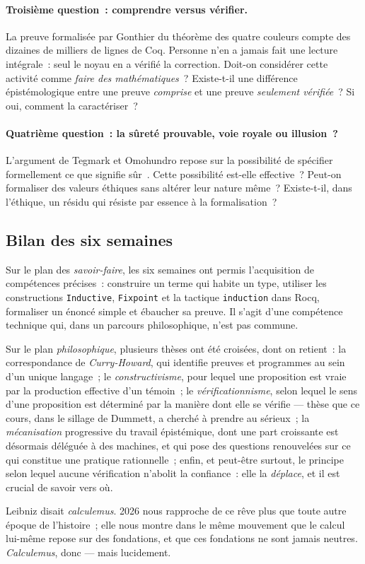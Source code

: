 \documentclass[11pt,a4paper]{article}
\begin{document}
\paragraph{Troisième question~: comprendre versus vérifier.} La preuve formalisée par Gonthier du théorème des quatre couleurs compte des dizaines de milliers de lignes de Coq. Personne n'en a jamais fait une lecture intégrale~: seul le noyau en a vérifié la correction. Doit-on considérer cette activité comme \emph{faire des mathématiques}~? Existe-t-il une différence épistémologique entre une preuve \emph{comprise} et une preuve \emph{seulement vérifiée}~? Si oui, comment la caractériser~?

\paragraph{Quatrième question~: la sûreté prouvable, voie royale ou illusion~?} L'argument de Tegmark et Omohundro repose sur la possibilité de spécifier formellement ce que signifie \og sûr~\fg. Cette possibilité est-elle effective~? Peut-on formaliser des valeurs éthiques sans altérer leur nature même~? Existe-t-il, dans l'éthique, un résidu qui résiste par essence à la formalisation~?

\bigskip

\subsection{Bilan des six semaines}

Sur le plan des \emph{savoir-faire}, les six semaines ont permis l'acquisition de compétences précises~: construire un terme qui habite un type, utiliser les constructions \texttt{Inductive}, \texttt{Fixpoint} et la tactique \texttt{induction} dans Rocq, formaliser un énoncé simple et ébaucher sa preuve. Il s'agit d'une compétence technique qui, dans un parcours philosophique, n'est pas commune.

Sur le plan \emph{philosophique}, plusieurs thèses ont été croisées, dont on retient~: la correspondance de \emph{Curry-Howard}, qui identifie preuves et programmes au sein d'un unique langage~; le \emph{constructivisme}, pour lequel une proposition est vraie par la production effective d'un témoin~; le \emph{vérificationnisme}, selon lequel le sens d'une proposition est déterminé par la manière dont elle se vérifie --- thèse que ce cours, dans le sillage de Dummett, a cherché à prendre au sérieux~; la \emph{mécanisation} progressive du travail épistémique, dont une part croissante est désormais déléguée à des machines, et qui pose des questions renouvelées sur ce qui constitue une pratique rationnelle~; enfin, et peut-être surtout, le principe selon lequel aucune vérification n'abolit la confiance~: elle la \emph{déplace}, et il est crucial de savoir vers où.

Leibniz disait \emph{calculemus}. 2026 nous rapproche de ce rêve plus que toute autre époque de l'histoire~; elle nous montre dans le même mouvement que le calcul lui-même repose sur des fondations, et que ces fondations ne sont jamais neutres. \emph{Calculemus}, donc --- mais lucidement.

\bigskip

\nocite{buzzardMathematicalReasoningComputer2025}
\printbibliography[title={Références}]
\end{document}
